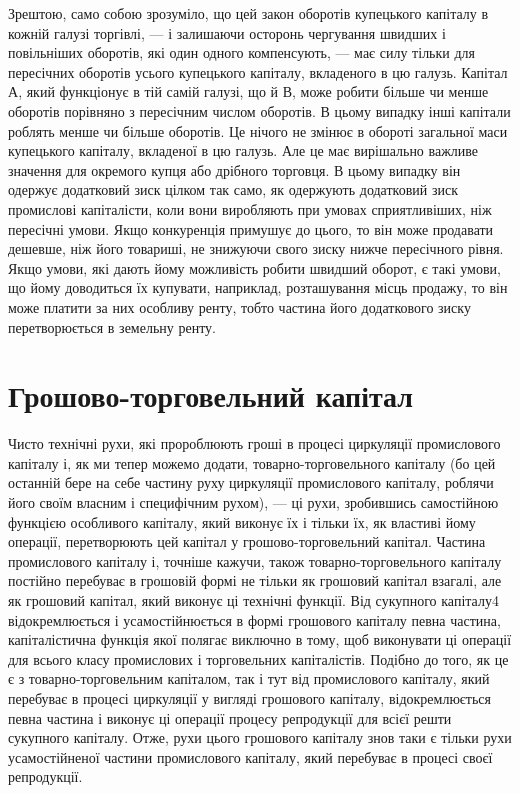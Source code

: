 Зрештою, само собою зрозуміло, що цей закон оборотів купецького
капіталу в кожній галузі торгівлі, — і залишаючи осторонь
чергування швидших і повільніших оборотів, які один одного компенсують,
— має силу тільки для пересічних оборотів усього купецького
капіталу, вкладеного в цю галузь. Капітал $А$, який функціонує
в тій самій галузі, що й $В$, може робити більше чи менше оборотів
порівняно з пересічним числом оборотів. В цьому випадку
інші капітали роблять менше чи більше оборотів. Це нічого не
змінює в обороті загальної маси купецького капіталу, вкладеної
в цю галузь. Але це має вирішально важливе значення для окремого
купця або дрібного торговця. В цьому випадку він одержує
додатковий зиск цілком так само, як одержують додатковий зиск
промислові капіталісти, коли вони виробляють при умовах сприятливіших,
ніж пересічні умови. Якщо конкуренція примушує до
цього, то він може продавати дешевше, ніж його товариші, не
знижуючи свого зиску нижче пересічного рівня. Якщо умови,
які дають йому можливість робити швидший оборот, є такі
умови, що йому доводиться їх купувати, наприклад, розташування
місць продажу, то він може платити за них особливу ренту,
тобто частина його додаткового зиску перетворюється в земельну
ренту.

\section{Грошово-торговельний капітал}

Чисто технічні рухи, які пророблюють гроші в процесі циркуляції
промислового капіталу і, як ми тепер можемо додати,
товарно-торговельного капіталу (бо цей останній бере на себе
частину руху циркуляції промислового капіталу, роблячи його
своїм власним і специфічним рухом), — ці рухи, зробившись самостійною
функцією особливого капіталу, який виконує їх і тільки їх,
як властиві йому операції, перетворюють цей капітал у грошово-торговельний
капітал. Частина промислового капіталу і, точніше
кажучи, також товарно-торговельного капіталу постійно перебуває
в грошовій формі не тільки як грошовий капітал взагалі, але
як грошовий капітал, який виконує ці технічні функції. Від сукупного
капіталу4 відокремлюється і усамостійнюється в формі грошового
капіталу певна частина, капіталістична функція якої
полягає виключно в тому, щоб виконувати ці операції для всього
класу промислових і торговельних капіталістів. Подібно до того,
як це є з товарно-торговельним капіталом, так і тут від промислового
капіталу, який перебуває в процесі циркуляції у вигляді
грошового капіталу, відокремлюється певна частина і виконує
ці операції процесу репродукції для всієї решти сукупного капіталу.
Отже, рухи цього грошового капіталу знов таки є тільки
рухи усамостійненої частини промислового капіталу, який перебуває
в процесі своєї репродукції.

